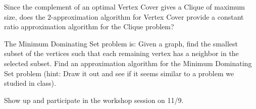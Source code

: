\documentclass[12pt]{article}
\newenvironment{problem}[2][Problem]
{\begin{trivlist}
\item[\hskip \labelsep {\bfseries #1}\hskip \labelsep {\bfseries #2.}]}{\end{trivlist}}
\begin{document}
\begin{problem}{3}
Since the complement of an optimal Vertex Cover gives a Clique of maximum size, does the $2$-approximation algorithm for Vertex Cover provide a constant ratio approximation algorithm for the Clique problem?
\end{problem}


\begin{problem}{4*}
The Minimum Dominating Set problem is: Given a graph, find the smallest subset of the vertices such that each remaining vertex has a neighbor in the selected subset. Find an approximation algorithm for the Minimum Dominating Set problem (hint: Draw it out and see if it seems similar to a problem we studied in class).
\end{problem}


\begin{problem}{5}
Show up and participate in the workshop session on 11/9.
\end{problem}
\end{document}
